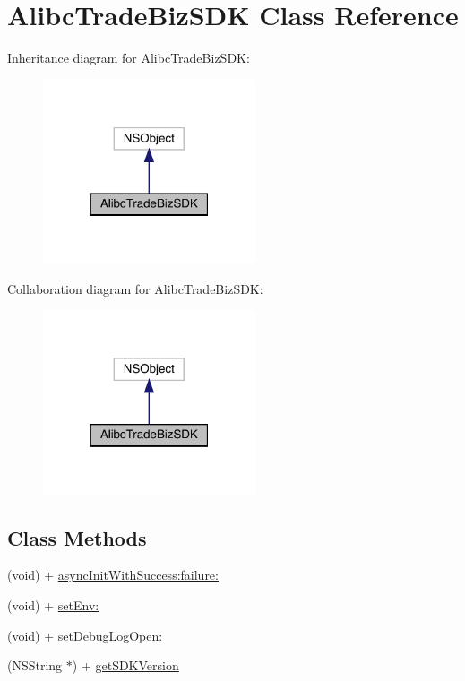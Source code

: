 \hypertarget{interface_alibc_trade_biz_s_d_k}{}\section{Alibc\+Trade\+Biz\+S\+DK Class Reference}
\label{interface_alibc_trade_biz_s_d_k}


Inheritance diagram for Alibc\+Trade\+Biz\+S\+DK\+:\nopagebreak
\begin{figure}[H]
\begin{center}
\leavevmode
\includegraphics[width=178pt]{interface_alibc_trade_biz_s_d_k__inherit__graph}
\end{center}
\end{figure}


Collaboration diagram for Alibc\+Trade\+Biz\+S\+DK\+:\nopagebreak
\begin{figure}[H]
\begin{center}
\leavevmode
\includegraphics[width=178pt]{interface_alibc_trade_biz_s_d_k__coll__graph}
\end{center}
\end{figure}
\subsection*{Class Methods}
\begin{DoxyCompactItemize}
\item 
(void) + \mbox{\hyperlink{interface_alibc_trade_biz_s_d_k_aa20381d7b680ac54f8993683ec81aeb6}{async\+Init\+With\+Success\+:failure\+:}}
\item 
(void) + \mbox{\hyperlink{interface_alibc_trade_biz_s_d_k_a41090673f57d4176b8b448a31b5abb28}{set\+Env\+:}}
\item 
(void) + \mbox{\hyperlink{interface_alibc_trade_biz_s_d_k_a6f1e1ff2c21b052128dcc6cf3350a3e6}{set\+Debug\+Log\+Open\+:}}
\item 
(N\+S\+String $\ast$) + \mbox{\hyperlink{interface_alibc_trade_biz_s_d_k_ade9e15def0980530603b5f9370de7725}{get\+S\+D\+K\+Version}}
\end{DoxyCompactItemize}


